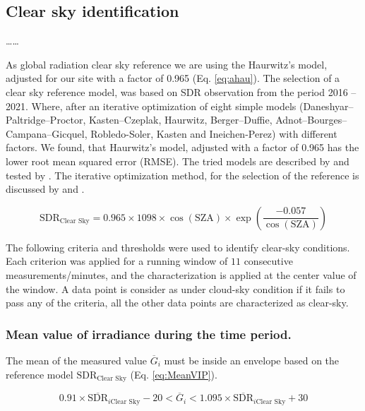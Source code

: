\documentclass[preprint, 3p,
authoryear]{elsarticle} %
\begin{document}
\hypertarget{clear-sky-identification}{%
\subsection{Clear sky identification}\label{clear-sky-identification}}

\ldots\ldots{}

As global radiation clear sky reference we are using the Haurwitz's
model, adjusted for our site with a factor of 0.965 (Eq. \ref{eq:ahau}).
The selection of a clear sky reference model, was based on SDR
observation from the period 2016 -- 2021. Where, after an iterative
optimization of eight simple models (Daneshyar--Paltridge--Proctor,
Kasten--Czeplak, Haurwitz, Berger--Duffie,
Adnot--Bourges--Campana--Gicquel, Robledo-Soler, Kasten and
Ineichen-Perez) with different factors. We found, that Haurwitz's model,
adjusted with a factor of 0.965 has the lower root mean squared error
(RMSE). The tried models are described by \citet{Reno2012} and tested by
\citet{Reno2016}. The iterative optimization method, for the selection
of the reference is discussed by \citet{Long2000} and \citet{Reno2016}.

\begin{equation}
\text{SDR}_\text{Clear Sky} = 0.965 \times 1098 \times \cos( \text{SZA} ) \times \exp \left( \frac{ - 0.057}{\cos(\text{SZA})} \right) \label{eq:ahau}
\end{equation}

The following criteria and thresholds were used to identify clear-sky
conditions. Each criterion was applied for a running window of \(11\)
consecutive measurements/minutes, and the characterization is applied at
the center value of the window. A data point is consider as under
cloud-sky condition if it fails to pass any of the criteria, all the
other data points are characterized as clear-sky.

\hypertarget{mean-value-of-irradiance-during-the-time-period.}{%
\subsubsection{Mean value of irradiance during the time
period.}\label{mean-value-of-irradiance-during-the-time-period.}}

The mean of the measured value \(\overline{G}_i\) must be inside an
envelope based on the reference model \(\text{SDR}_\text{Clear Sky}\)
(Eq. \ref{eq:MeanVIP}).

\begin{equation}
0.91 \times \overline{\text{SDR}}_{i\text{Clear Sky}} - 20
< \overline{G}_i <
1.095 \times \overline{\text{SDR}}_{i\text{Clear Sky}} + 30
\label{eq:MeanVIP}
\end{equation}
\end{document}
